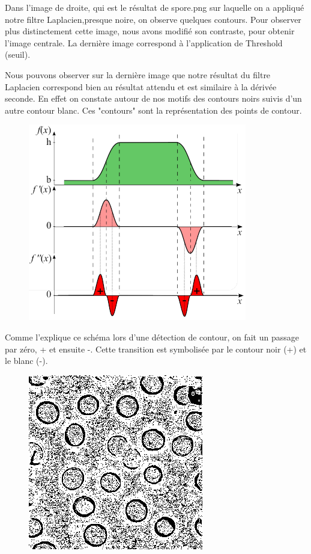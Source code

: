 \documentclass[a4paper,12pt]{report}
\begin{document}
Dans l'image de droite, qui est le résultat de spore.png sur laquelle on a appliqué notre filtre Laplacien,presque noire, on observe quelques contours. 
Pour observer plus distinctement cette image, nous avons modifié son contraste, pour obtenir l'image centrale. 
La dernière image correspond à l'application de Threshold (seuil).

Nous pouvons observer sur la dernière image que notre résultat du filtre Laplacien correspond bien au résultat attendu et est similaire à la dérivée seconde.
En effet on constate autour de nos motifs des contours noirs suivis d'un autre contour blanc. Ces "contours" sont la représentation des points de contour.

\begin{figure}[!ht]
	\center	
	\includegraphics[scale=0.5]{image/laplacian_schema.png}
\end{figure}

Comme l'explique ce schéma lors d'une détection de contour, on fait un passage par zéro, + et ensuite -. 
Cette transition est symbolisée par le contour noir (+) et le blanc (-).

\begin{figure}[!ht]
	\center	
	\includegraphics[scale=0.5]{image/laplacian_convolve5.png}
\end{figure}
\end{document}
